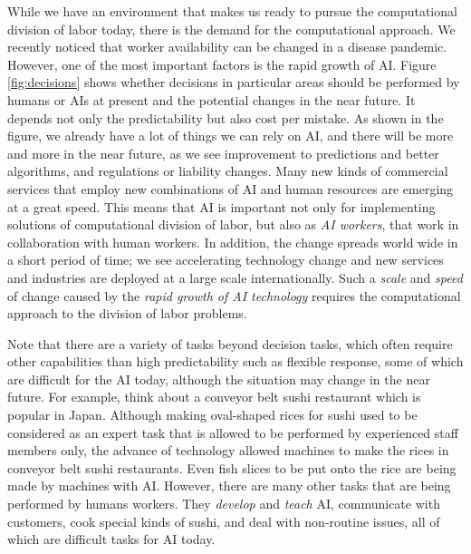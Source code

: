 While we have an environment that makes us ready to pursue the computational division of labor today, there is the demand for the computational approach.
We recently noticed that worker availability can be changed in a disease pandemic. However, one of the most important factors is the rapid growth of AI. Figure \ref{fig:decisions} shows whether decisions in particular areas should be performed by humans or AIs at present and the potential changes in the near future. 
It depends not only  the predictability but also cost per mistake. As shown in the figure, we already have a lot of things we can rely on  AI, and there will be more and more in the near future, as we see 
improvement to predictions and better algorithms, and regulations or liability changes. 
Many new kinds of commercial services that employ new combinations of AI and human resources are emerging at a great speed.
This means that AI is important not only for implementing solutions of computational division of labor, but also as  {\it AI workers}, that work in collaboration with human workers.
In addition, the change spreads world wide in a short period of time; we see accelerating technology change \cite{Kur01} and new services and industries are deployed at a large scale internationally.
Such a {\it scale} and {\it speed} of change caused by the {\it rapid growth of AI technology} requires the computational approach to the division of labor problems.

Note that there are a variety of tasks beyond decision tasks, which often require other capabilities than high predictability such as flexible response, some of which are difficult for the AI today, although the situation may change in the near future.
For example, think about a conveyor belt sushi restaurant which is popular in Japan. Although making oval-shaped rices for sushi used to be considered as an expert task that is allowed to be performed by  experienced staff members only, the advance of technology allowed
machines to make the rices in conveyor belt sushi restaurants. Even fish slices to be put onto the rice are being made by machines with AI.
However, there are many other tasks that are being performed by humans workers. They {\it develop} and {\it teach} AI,  communicate with customers,  cook special kinds of sushi, and deal with non-routine issues, all of which are difficult tasks for AI today.


